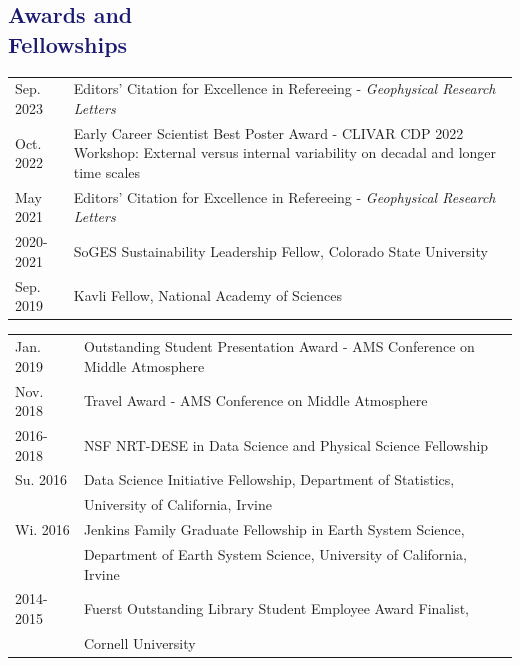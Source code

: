 \documentclass[margin,line,palatino,courier,10pt]{res}
\begin{document}
\begin{resume}
\section{\sc \textcolor{MidnightBlue}{\large{\textbf{Awards and\\ Fellowships}}}}
\begin{tabular}{@{}p{0.9in}p{4in}}
Sep. 2023 & Editors' Citation for Excellence in Refereeing - \textit{Geophysical Research Letters}\\
Oct. 2022 & Early Career Scientist Best Poster Award - CLIVAR CDP 2022 Workshop: External versus internal variability on decadal and longer time scales\\
May 2021 & Editors' Citation for Excellence in Refereeing - \textit{Geophysical Research Letters}\\
2020-2021 & SoGES Sustainability Leadership Fellow, Colorado State University\\
Sep. 2019 & Kavli Fellow, National Academy of Sciences\\
\end{tabular}
\begin{tabular}{@{}p{0.9in}p{4in}}
Jan. 2019 & Outstanding Student Presentation Award - AMS Conference on Middle Atmosphere\\
Nov. 2018 & Travel Award - AMS Conference on Middle Atmosphere\\
2016-2018 & NSF NRT-DESE in Data Science and Physical Science Fellowship\\
Su. 2016 & Data Science Initiative Fellowship, Department of Statistics, \\
& University of California, Irvine\\
Wi. 2016 & Jenkins Family Graduate Fellowship in Earth System Science,\\ 
& Department of Earth System
Science, University of California, Irvine\\
2014-2015 & Fuerst Outstanding Library Student Employee Award Finalist,\\
& Cornell University
\end{tabular}


\vspace{-0.1in}
\noindent\textcolor{MidnightBlue}{\makebox[\linewidth][r]{\rule{\textwidth}{5pt}}}
\vspace{-0.3in}


\end{resume}
\end{document}
